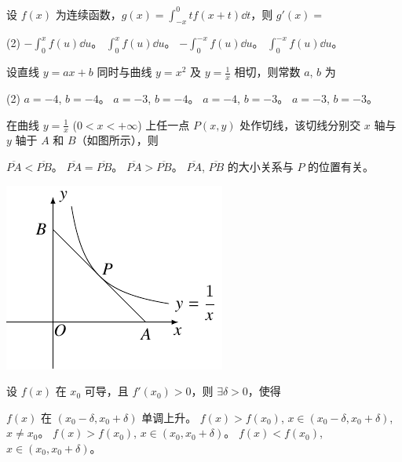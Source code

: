 \begin{ti}
	设 $f(x)$ 为连续函数，$g(x) = \int_{-x}^0 tf(x+t) \dd{t}$，则 $g'(x) = $
	\begin{tasks}(2)
		\task $-\int_0^x f(u) \dd{u}$。
		\task $\int_0^x f(u) \dd{u}$。
		\task $-\int_0^{-x} f(u) \dd{u}$。
		\task $\int_0^{-x} f(u) \dd{u}$。
	\end{tasks}
\end{ti}

\begin{ti}
	设直线 $y=ax+b$ 同时与曲线 $y=x^2$ 及 $y = \frac{1}{x}$ 相切，则常数 $a$, $b$ 为
	\begin{tasks}(2)
		\task $a=-4$, $b=-4$。
		\task $a=-3$, $b=-4$。
		\task $a=-4$, $b=-3$。
		\task $a=-3$, $b=-3$。
	\end{tasks}
\end{ti}

\begin{ti}
	\parbox[c]{0.6\textwidth}{%
	在曲线 $y = \frac{1}{x}$ ($0 < x < +\infty$) 上任一点 $P(x,y)$ 处作切线，该切线分别交 $x$ 轴与 $y$ 轴于 $A$ 和 $B$（如图所示），则
	\begin{tasks}
		\task $\overline{PA} < \overline{PB}$。
		\task $\overline{PA} = \overline{PB}$。
		\task $\overline{PA} > \overline{PB}$。
		\task $\overline{PA}$, $\overline{PB}$ 的大小关系与 $P$ 的位置有关。
	\end{tasks}
	}%
	\parbox[c]{0.4\textwidth}{\centering\includegraphics{figure/fig157.pdf}}
\end{ti}

\begin{ti}
	设 $f(x)$ 在 $x_0$ 可导，且 $f'(x_0)>0$，则 $\exists \delta > 0$，使得
	\begin{tasks}
		\task $f(x)$ 在 $(x_0-\delta,x_0+\delta)$ 单调上升。
		\task $f(x)>f(x_0)$, $x \in (x_0-\delta,x_0+\delta)$, $x \ne x_0$。
		\task $f(x)>f(x_0)$, $x \in (x_0,x_0+\delta)$。
		\task $f(x)<f(x_0)$, $x \in (x_0,x_0+\delta)$。
	\end{tasks}
\end{ti}

